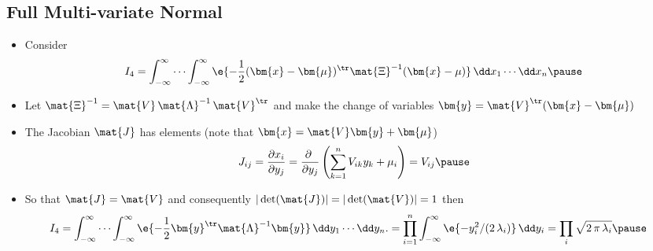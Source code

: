 \begin{slide}
\section[-2]{Full Multi-variate Normal}

\begin{PauseHighLight}\small
  \begin{itemize}
  \item Consider
    \begin{align*}
      I_4 =  \int_{-\infty}^\infty \cdots \int_{-\infty}^\infty
      \e{-\frac{1}{2}  (\bm{x}-\bm{\mu})^\tr \mat{\Xi}^{-1} (\bm{x}-\mu)} \, \dd x_1 \cdots \dd x_n\pause
    \end{align*}
  \item Let $\mat{\Xi}^{-1} =
    \mat{V}\,\mat{\Lambda}^{-1}\,\mat{V}^\tr$  and make the change of
    variables $\bm{y}= \mat{V}^\tr(\bm{x}-\bm{\mu})$\pause
  \item The Jacobian $\mat{J}$ has elements (note that $\bm{x} =
    \mat{V}\bm{y} + \bm{\mu}$)
    \begin{align*}
          J_{ij} = \frac{\partial x_i}{\partial y_j} = \frac{\partial
          \ }{\partial y_j} \left(\sum_{k=1}^n V_{ik} y_k + \mu_i\right) = V_{ij}\pause
    \end{align*}
  \item So that $\mat{J} = \mat{V}$ and consequently $|\det(\mat{J})| =
    |\det(\mat{V})| = 1$\pause{} then
    \begin{align*}
      I_4 &=  \int_{-\infty}^\infty \cdots \int_{-\infty}^\infty
            \e{-\frac{1}{2}  \bm{y}^\tr \mat{\Lambda}^{-1} \bm{y}}
            \, \dd y_1 \cdots \dd y_n.
            = \prod_{i=1}^n  \int_{-\infty}^\infty
            \e{-y_i^2/(2\,\lambda_i)} \, \dd y_i = \prod_i
            \sqrt{2\,\pi\,\lambda_i}\pause
    \end{align*}
  \end{itemize}
\end{PauseHighLight}

\end{slide}


